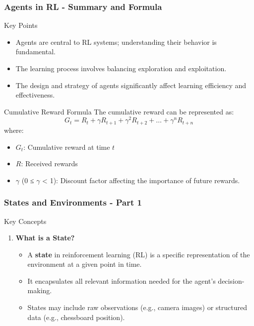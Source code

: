 \documentclass{beamer}
\begin{document}
\begin{frame}[fragile]
    \frametitle{Agents in RL - Summary and Formula}
    \begin{block}{Key Points}
        \begin{itemize}
            \item Agents are central to RL systems; understanding their behavior is fundamental.
            \item The learning process involves balancing exploration and exploitation.
            \item The design and strategy of agents significantly affect learning efficiency and effectiveness.
        \end{itemize}
    \end{block}
    
    \begin{block}{Cumulative Reward Formula}
        The cumulative reward can be represented as:
        \begin{equation}
            G_t = R_t + \gamma R_{t+1} + \gamma^2 R_{t+2} + \ldots + \gamma^{n}R_{t+n}
        \end{equation}
        where:
        \begin{itemize}
            \item \( G_t \): Cumulative reward at time \( t \)
            \item \( R \): Received rewards
            \item \( \gamma \) (0 ≤ \( \gamma \) < 1): Discount factor affecting the importance of future rewards.
        \end{itemize}
    \end{block}
\end{frame}

\begin{frame}[fragile]
    \frametitle{States and Environments - Part 1}
    \begin{block}{Key Concepts}
        \begin{enumerate}
            \item \textbf{What is a State?}
            \begin{itemize}
                \item A \textbf{state} in reinforcement learning (RL) is a specific representation of the environment at a given point in time.
                \item It encapsulates all relevant information needed for the agent's decision-making.
                \item States may include raw observations (e.g., camera images) or structured data (e.g., chessboard position).
            \end{itemize}
        \end{enumerate}
    \end{block}
\end{frame}
\end{document}
